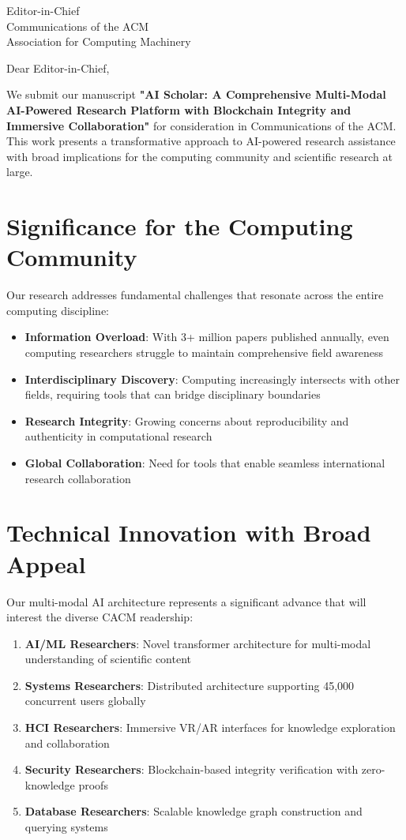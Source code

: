 \documentclass[11pt]{letter}
\begin{document}
\begin{letter}{Editor-in-Chief\\
Communications of the ACM\\
Association for Computing Machinery}

\opening{Dear Editor-in-Chief,}

We submit our manuscript \textbf{"AI Scholar: A Comprehensive Multi-Modal AI-Powered Research Platform with Blockchain Integrity and Immersive Collaboration"} for consideration in Communications of the ACM. This work presents a transformative approach to AI-powered research assistance with broad implications for the computing community and scientific research at large.

\section*{Significance for the Computing Community}

Our research addresses fundamental challenges that resonate across the entire computing discipline:

\begin{itemize}
    \item \textbf{Information Overload}: With 3+ million papers published annually, even computing researchers struggle to maintain comprehensive field awareness
    \item \textbf{Interdisciplinary Discovery}: Computing increasingly intersects with other fields, requiring tools that can bridge disciplinary boundaries
    \item \textbf{Research Integrity}: Growing concerns about reproducibility and authenticity in computational research
    \item \textbf{Global Collaboration}: Need for tools that enable seamless international research collaboration
\end{itemize}

\section*{Technical Innovation with Broad Appeal}

Our multi-modal AI architecture represents a significant advance that will interest the diverse CACM readership:

\begin{enumerate}
    \item \textbf{AI/ML Researchers}: Novel transformer architecture for multi-modal understanding of scientific content
    \item \textbf{Systems Researchers}: Distributed architecture supporting 45,000 concurrent users globally
    \item \textbf{HCI Researchers}: Immersive VR/AR interfaces for knowledge exploration and collaboration
    \item \textbf{Security Researchers}: Blockchain-based integrity verification with zero-knowledge proofs
    \item \textbf{Database Researchers}: Scalable knowledge graph construction and querying systems
\end{enumerate}


\end{letter}
\end{document}
